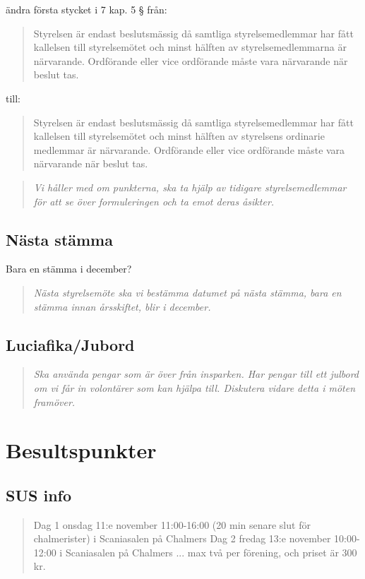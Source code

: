 \documentclass[protokoll]{dvd}
\begin{document}
\begin{attsatser}
    \item 
    ändra första stycket i 7 kap. 5 § från:
    \begin{quote}
        Styrelsen är endast beslutsmässig då samtliga styrelsemedlemmar har fått kallelsen till styrelsemötet och minst hälften av styrelsemedlemmarna är närvarande.
        Ordförande eller vice ordförande måste vara närvarande när beslut tas.
    \end{quote}
    till:
    \begin{quote}
        Styrelsen är endast beslutsmässig då samtliga styrelsemedlemmar har fått kallelsen till styrelsemötet och minst hälften av styrelsens ordinarie medlemmar är närvarande.
        Ordförande eller vice ordförande måste vara närvarande när beslut tas.
    \end{quote}
\end{attsatser}

\begin{quote}
    \textit{Vi håller med om punkterna, ska ta hjälp av tidigare styrelsemedlemmar för att se över formuleringen och ta emot deras åsikter.}
\end{quote}

\subsection*{Nästa stämma}
Bara en stämma i december?
\\
\begin{quote}
    \textit{Nästa styrelsemöte ska vi bestämma datumet på nästa stämma, bara en stämma innan årsskiftet, blir i december.}
\end{quote}


\subsection*{Luciafika/Jubord}
\begin{quote}
    \textit{Ska använda pengar som är över från insparken. Har pengar till ett julbord om vi får in volontärer som kan hjälpa till. Diskutera vidare detta i möten framöver.}
\end{quote}

\section{Besultspunkter}

\subsection{SUS info}
\begin{quote}
    Dag 1 onsdag 11:e november 11:00-16:00 (20 min senare slut för chalmerister) i Scaniasalen på Chalmers
    Dag 2 fredag 13:e november 10:00-12:00 i Scaniasalen på Chalmers
    ...
    max två per förening, och priset är 300 kr.
\end{quote}
\end{document}
